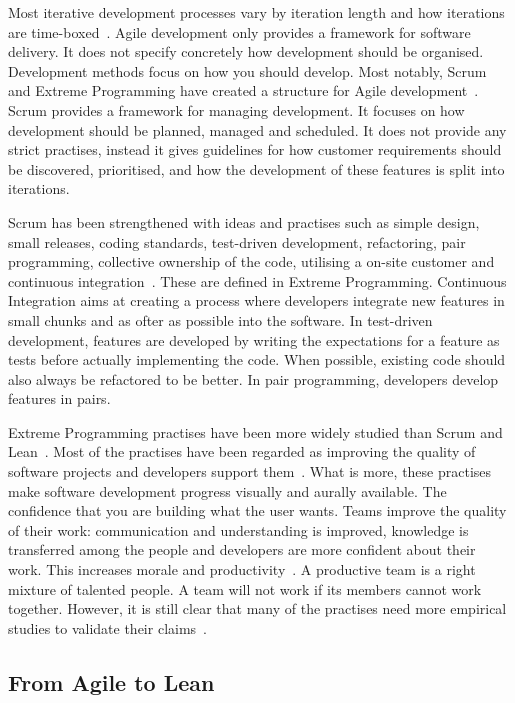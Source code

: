 \documentclass[english]{tktltiki2}
\begin{document}
Most iterative development processes vary by iteration length and how iterations are time-boxed~\cite{LB03}. Agile development only provides a framework for software delivery. It does not specify concretely how development should be organised. Development methods focus on how you should develop. Most notably, Scrum and Extreme Programming have created a structure for Agile development~\cite{LB03, Fow05, SS10}. Scrum provides a framework for managing development. It focuses on how development should be planned, managed and scheduled. It does not provide any strict practises, instead it gives guidelines for how customer requirements should be discovered, prioritised, and how the development of these features is split into iterations.

Scrum has been strengthened with ideas and practises such as simple design, small releases, coding standards, test-driven development, refactoring, pair programming, collective ownership of the code, utilising a on-site customer and continuous integration~\cite{DD08}. These are defined in Extreme Programming. Continuous Integration aims at creating a process where developers integrate new features in small chunks and as ofter as possible into the software. In test-driven development, features are developed by writing the expectations for a feature as tests before actually implementing the code. When possible, existing code should also always be refactored to be better. In pair programming, developers develop features in pairs.

Extreme Programming practises have been more widely studied than Scrum and Lean~\cite{DD08}. Most of the practises have been regarded as improving the quality of software projects and developers support them~\cite{DD08, SS10}. What is more, these practises make software development progress visually and aurally available. The confidence that you are building what the user wants. Teams improve the quality of their work: communication and understanding is improved, knowledge is transferred among the people and developers are more confident about their work. This increases morale and productivity~\cite{SS10}. A productive team is a right mixture of talented people. A team will not work if its members cannot work together. However, it is still clear that many of the practises need more empirical studies to validate their claims~\cite{DD08}.

\subsection{From Agile to Lean}
\end{document}
